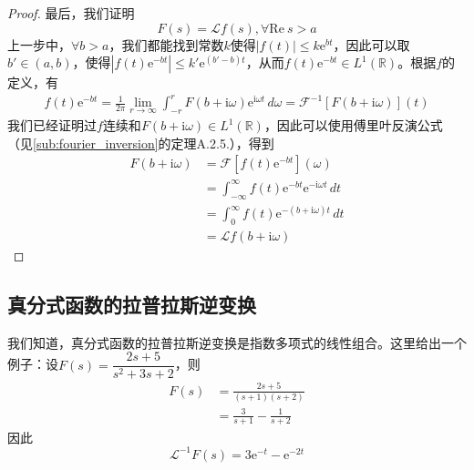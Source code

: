 \documentclass{ctexbook}
\begin{document}
\begin{proof}
    最后，我们证明
    $$F(s)=\mathcal{L} f(s),\forall \text{Re}\ s>a$$
    上一步中，$\forall b>a$，我们都能找到常数$k$使得$|f(t)|\leq k \mathrm{e}^{b t}$，因此可以取$b'\in(a,b)$，使得$|f(t)\mathrm{e}^{-bt}|\leq k'\mathrm{e}^{(b'-b)t}$，从而$f(t)\mathrm{e}^{-bt}\in L^1(\mathbb{R})$。根据$f$的定义，有
    \begin{align*}
        f(t)\mathrm{e}^{-b t}=\frac{1}{2\pi}\lim_{r\to\infty}\int_{-r}^{r}F(b+\mathrm{i}\omega)\mathrm{e}^{\mathrm{i}\omega t}\,d\omega
        =\mathcal{F}^{-1} [F(b+\mathrm{i}\omega)](t)
    \end{align*}
    我们已经证明过$f$连续和$F(b+\mathrm{i}\omega)\in L^1(\mathbb{R})$，因此可以使用傅里叶反演公式（见\ref{sub:fourier_inversion}的定理A.2.5.），得到
    \begin{align*}
        F(b+\mathrm{i}\omega)&=\mathcal{F} [f(t)\mathrm{e}^{-b t}](\omega)\\
        &=\int_{-\infty}^{\infty}f(t)\mathrm{e}^{-b t}\mathrm{e}^{-\mathrm{i}\omega t}\,dt\\
        &=\int_{0}^{\infty}f(t)\mathrm{e}^{-(b+\mathrm{i}\omega) t}\,dt\\
        &=\mathcal{L} f(b+\mathrm{i}\omega)
    \end{align*}
\end{proof}

\subsection{真分式函数的拉普拉斯逆变换}\label{sub:frac_laplace_inverse}
\begin{example}[真分式函数]
    我们知道，真分式函数的拉普拉斯逆变换是指数多项式的线性组合。这里给出一个例子：设$F(s)=\dfrac{2s+5}{s^2+3s+2}$，则
    \begin{align*}
        F(s)&=\frac{2s+5}{(s+1)(s+2)}\\
        &=\frac{3}{s+1}-\frac{1}{s+2}
    \end{align*}
    因此
    \[\mathcal{L}^{-1} F(s)=3\mathrm{e}^{-t}-\mathrm{e}^{-2t}\]
\end{example}
\end{document}
